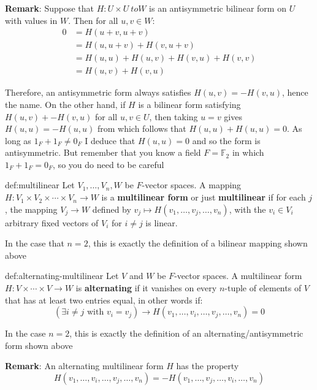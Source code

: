 \documentclass{article}
\begin{document}
\textbf{Remark}: Suppose that $H : U \times U \ to W$ is an antisymmetric bilinear form on $U$ with values in $W$. Then for all $u, v\in W$:
\begin{align*}
    0 &= H(u + v, u + v)\\
      &= H(u,u + v) + H(v, u + v)\\
      &= H(u,u) + H(u,v) + H(v, u) + H(v, v)\\
      &= H(u, v) + H(v, u)
\end{align*}

Therefore, an antisymmetric form always satisfies $H(u, v) = -H(v, u)$, hence the name. On the other hand, if $H$ is a bilinear form satisfying $H(u, v) + -H(v, u)$ for all $u,v\in U$, then taking $u = v$ gives $H(u,u) = -H(u,u)$ from which follows that $H(u,u) + H(u,u) = 0$. As long as $1_{F} + 1_{F} \ne 0_{F}$ I deduce that $H(u,u) = 0$ and so the form is antisymmetric. But remember that you know a field $F = \mathbb{F}_{2}$ in which $1_{F} + 1_{F} = 0_{F}$, so you do need to be careful


\begin{dfn}{def:multilinear}{}
    Let $V_{1},\dots,V_{n}, W$ be $F$-vector spaces. A mapping $H : V_{1} \times V_{2} \times \cdots \times V_{n} \to W$ is a \textbf{multilinear form} or just \textbf{multilinear} if for each $j$, the mapping $V_{j}\to W$ defined by $v_{j}\mapsto H(v_{1},\dots,v_{j},\dots,v_{n})$, with the $v_{i}\in V_{i}$ arbitrary fixed vectors of $V_{i}$ for $i\ne j$ is linear. 
\end{dfn}
In the case that $n = 2$, this is exactly the definition of a bilinear mapping shown above

\begin{dfn}{def:alternating-multilinear}{}
    Let $V$ and $W$ be $F$-vector spaces. A multilinear form $ H : V \times \cdots \times V \to W$ is \textbf{alternating} if it vanishes on every $n$-tuple of elements of $V$ that has at least two entries equal, in other words if:
    \[(\exists i\ne j \text{ with } v_{i} = v_{j})\to H(v_{1},\dots,v_{i},\dots,v_{j},\dots,v_{n}) = 0\]
\end{dfn}



In the case $n = 2$, this is exactly the definition of an alternating/antisymmetric form shown above

\textbf{Remark}: An alternating multilinear form $H$ has the property
\[H(v_{1},\dots,v_{i},\dots,v_{j},\dots,v_{n}) = -H(v_{1},\dots,v_{j},\dots,v_{i},\dots,v_{n})\]
\end{document}
